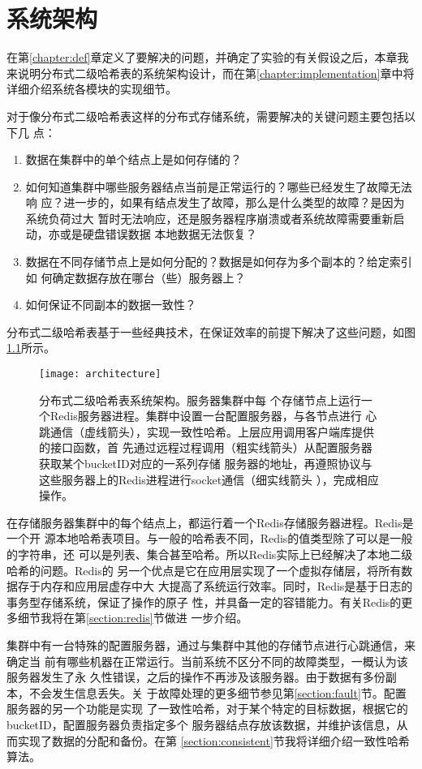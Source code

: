 \chapter{系统架构}
在第\ref{chapter:def}章定义了要解决的问题，并确定了实验的有关假设之后，本章我
来说明分布式二级哈希表的系统架构设计，而在第\ref{chapter:implementation}章中将
详细介绍系统各模块的实现细节。

对于像分布式二级哈希表这样的分布式存储系统，需要解决的关键问题主要包括以下几
点：
\begin{enumerate}
  \item 数据在集群中的单个结点上是如何存储的？
  \item 如何知道集群中哪些服务器结点当前是正常运行的？哪些已经发生了故障无法响
  应？进一步的，如果有结点发生了故障，那么是什么类型的故障？是因为系统负荷过大
  暂时无法响应，还是服务器程序崩溃或者系统故障需要重新启动，亦或是硬盘错误数据
  本地数据无法恢复？
  \item 数据在不同存储节点上是如何分配的？数据是如何存为多个副本的？给定索引如
  何确定数据存放在哪台（些）服务器上？
  \item 如何保证不同副本的数据一致性？
\end{enumerate}
分布式二级哈希表基于一些经典技术，在保证效率的前提下解决了这些问题，如图
\ref{figure:architecture}所示。

\begin{figure}[htb]
  \centering
  \texttt{[image: architecture]}
  \caption[分布式二级哈希表系统架构]{分布式二级哈希表系统架构。服务器集群中每
  个存储节点上运行一个Redis服务器进程。集群中设置一台配置服务器，与各节点进行
  心跳通信（虚线箭头），实现一致性哈希。上层应用调用客户端库提供的接口函数，首
  先通过远程过程调用（粗实线箭头）从配置服务器获取某个bucketID对应的一系列存储
  服务器的地址，再遵照协议与这些服务器上的Redis进程进行socket通信（细实线箭头
  ），完成相应操作。}
  \label{figure:architecture}
\end{figure}

在存储服务器集群中的每个结点上，都运行着一个Redis存储服务器进程。Redis是一个开
源本地哈希表项目。与一般的哈希表不同，Redis的值类型除了可以是一般的字符串，还
可以是列表、集合甚至哈希。所以Redis实际上已经解决了本地二级哈希的问题。Redis的
另一个优点是它在应用层实现了一个虚拟存储层，将所有数据存于内存和应用层虚存中大
大提高了系统运行效率。同时，Redis是基于日志的事务型存储系统，保证了操作的原子
性，并具备一定的容错能力。有关Redis的更多细节我将在第\ref{section:redis}节做进
一步介绍。

集群中有一台特殊的配置服务器，通过与集群中其他的存储节点进行心跳通信，来确定当
前有哪些机器在正常运行。当前系统不区分不同的故障类型，一概认为该服务器发生了永
久性错误，之后的操作不再涉及该服务器。由于数据有多份副本，不会发生信息丢失。关
于故障处理的更多细节参见第\ref{section:fault}节。配置服务器的另一个功能是实现
了一致性哈希，对于某个特定的目标数据，根据它的bucketID，配置服务器负责指定多个
服务器结点存放该数据，并维护该信息，从而实现了数据的分配和备份。在第
\ref{section:consistent}节我将详细介绍一致性哈希算法。

